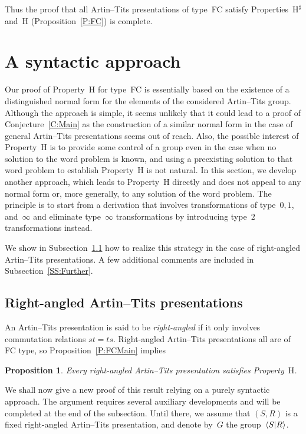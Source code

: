 \documentclass{amsart}
\numberwithin{equation}{section}
\theoremstyle{plain}
\newtheorem{prop}{Proposition}[section]
\theoremstyle{definition}
\begin{document}
Thus the proof that all Artin--Tits presentations of type~FC satisfy Properties~${{\mathrm{H}}^\sharp}$ and~${\mathrm{H}}$ (Proposition~\ref{P:FC}) is complete.

\section{A syntactic approach}
\label{S:RAAG}

Our proof of Property~${\mathrm{H}}$ for type~FC is essentially based on the existence of a distinguished normal form for the elements of the considered Artin--Tits group. Although the approach is simple, it seems unlikely that it could lead to a proof of Conjecture~\ref{C:Main} as the construction of a similar normal form in the case of general Artin--Tits presentations seems out of reach. Also, the possible interest of Property~${\mathrm{H}}$ is to provide some control of a group even in the case when no solution to the word problem is known, and using a preexisting solution to that word problem to establish Property~${\mathrm{H}}$ is not natural. In this section, we develop another approach, which leads to Property~${\mathrm{H}}$ directly and does not appeal to any normal form or, more generally, to any solution of the word problem. The principle is to start from a derivation that involves transformations of type~$0, 1$, and~$\infty$ and eliminate type~$\infty$ transformations by introducing type~$2$ transformations instead. 

We show in Subsection~\ref{SS:RAAG} how to realize this strategy in the case of right-angled Artin--Tits presentations. A few additional comments are included in Subsection~\ref{SS:Further}. 

\subsection{Right-angled Artin--Tits presentations}
\label{SS:RAAG}

An Artin--Tits presentation is said to be \emph{right-angled} if it only involves commutation relations ${s} {t} = {t} {s}$. Right-angled Artin--Tits presentations all are of FC type, so Proposition~\ref{P:FCMain} implies 

\begin{prop}
\label{P:RA}
Every right-angled Artin--Tits presentation satisfies Property~${\mathrm{H}}$.
\end{prop}

We shall now give a new proof of this result relying on a purely syntactic approach. The argument requires several auxiliary developments and will be completed at the end of the subsection. Until there, we assume that $({S}, {R})$ is a fixed right-angled Artin--Tits presentation, and denote by~${G}$ the group~${\langle{S}{\mid}\nobreak{R}\rangle}$. 
\end{document}
